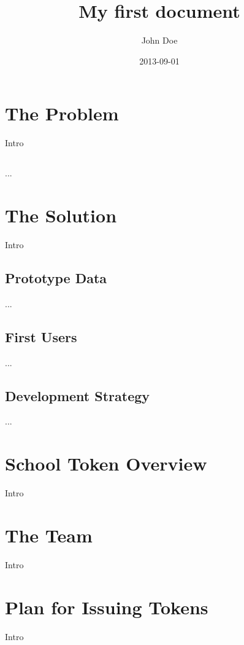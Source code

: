 \documentclass{article}
\title{My first document}
\date{2013-09-01}
\author{John Doe}
\begin{document}
  \maketitle
  \newpage

  \section{The Problem}

  Intro

  \subsection{}

  ...

  \section{The Solution}

  Intro

  \subsection{Prototype Data}

  ...

  \subsection{First Users}

  ...

  \subsection{Development Strategy}

  ...

  \section{School Token Overview}

  Intro

  \section{The Team}

  Intro

  \section{Plan for Issuing Tokens}

  Intro
\end{document}
